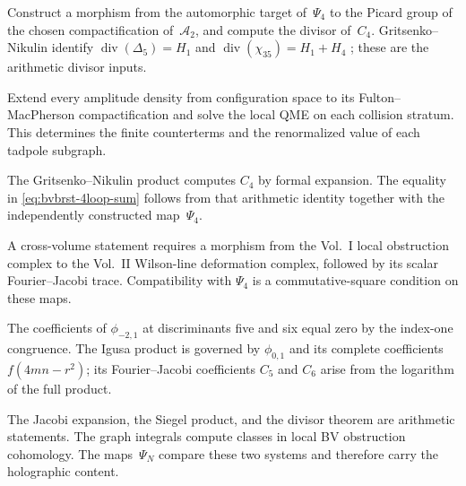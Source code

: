 \begin{problem}
\label{rem:bvbrst-4loop-humbert-pair}
Construct a morphism from the automorphic target of~$\Psi_4$ to the
Picard group of the chosen compactification of~$\mathcal A_2$, and
compute the divisor of~$C_4$.  Gritsenko--Nikulin identify
$\operatorname{div}(\Delta _5)=H_1$ and
$\operatorname{div}(\chi_{35})=H_1+H_4$
\cite[pp.~3--4]{GN96Igusa}; these are the arithmetic divisor inputs.
\end{problem}

\begin{problem}
\label{rem:bvbrst-4loop-divergence}
Extend every amplitude density from configuration space to its
Fulton--MacPherson compactification and solve the local QME on each
collision stratum.  This determines the finite counterterms and the
renormalized value of each tadpole subgraph.
\end{problem}

\begin{corollary}
\label{cor:bvbrst-4loop-cross-verify}
The Gritsenko--Nikulin product computes $C_4$ by formal expansion.
The equality in \eqref{eq:bvbrst-4loop-sum} follows from that arithmetic
identity together with the independently constructed map~$\Psi_4$.
\end{corollary}

\begin{remark}
\label{rem:bvbrst-4loop-vol2-companion}
A cross-volume statement requires a morphism from the Vol.~I local
obstruction complex to the Vol.~II Wilson-line deformation complex,
followed by its scalar Fourier--Jacobi trace.  Compatibility with
$\Psi_4$ is a commutative-square condition on these maps.
\end{remark}

\begin{remark}
\label{rem:bvbrst-heegner-c5-c6-vanishing}
The coefficients of $\phi_{-2,1}$ at discriminants five and six
equal zero by the index-one congruence.  The Igusa product is governed by
$\phi_{0,1}$ and its complete coefficients $f(4mn-r^2)$; its
Fourier--Jacobi coefficients $C_5$ and $C_6$ arise from the logarithm
of the full product.
\end{remark}

\begin{remark}
\label{rem:bvbrst-heegner-multipath}
The Jacobi expansion, the Siegel product, and the divisor theorem are
arithmetic statements.  The graph integrals compute classes in local
BV obstruction cohomology.  The maps~$\Psi_N$ compare these two
systems and therefore carry the holographic content.
\end{remark}


